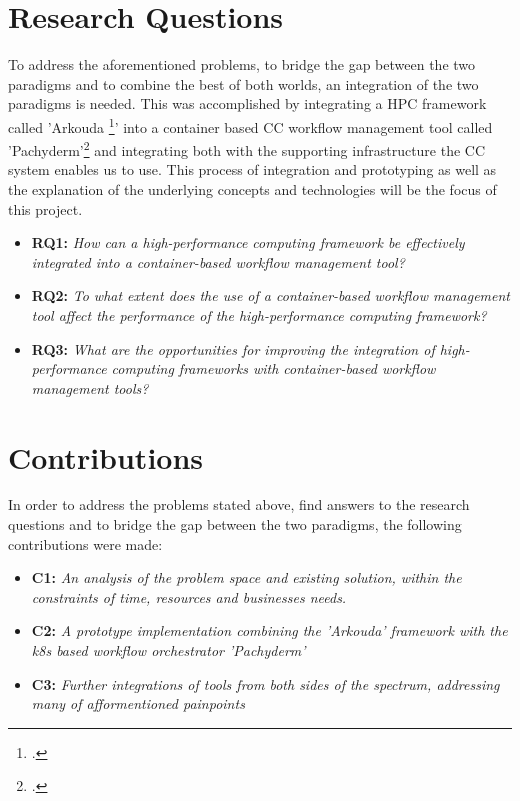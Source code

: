 \section{Research Questions}

To address the aforementioned problems, to bridge the gap between the two paradigms and to combine the best of both worlds, an integration of the two paradigms is needed.
This was accomplished by integrating a \ac{HPC} framework called 'Arkouda \footcite{merrillArkoudaInteractiveData2019}' into a container based \ac{CC} workflow management tool called 'Pachyderm'\footcite{pachydermPachyderm} and integrating both with the supporting infrastructure the \ac{CC} system enables us to use.
This process of integration and prototyping as well as the explanation of the underlying concepts and technologies will be the focus of this project.

\begin{itemize}
    \item \textbf{RQ1:} \textit{
        How can a high-performance computing framework be effectively integrated into a container-based workflow management tool?
    }
    \item \textbf{RQ2:} \textit{
        To what extent does the use of a container-based workflow management tool affect the performance of the high-performance computing framework?
    }
    \item \textbf{RQ3:} \textit{
        What are the opportunities for improving the integration of high-performance computing frameworks with container-based workflow management tools?
    }
\end{itemize}

\newpage

\section{Contributions}

In order to address the problems stated above, find answers to the research questions and to bridge the gap between the two paradigms, the following contributions were made:
\begin{itemize}
    \item \textbf{C1:} \textit{ An analysis of the problem space and existing solution, within the constraints of time, resources and businesses needs.}
    \item \textbf{C2:} \textit{ A prototype implementation combining the 'Arkouda' framework with the \ac{k8s} based workflow orchestrator 'Pachyderm'}
    \item \textbf{C3:} \textit{ Further integrations of tools from both sides of the spectrum, addressing many of afformentioned painpoints}
\end{itemize}